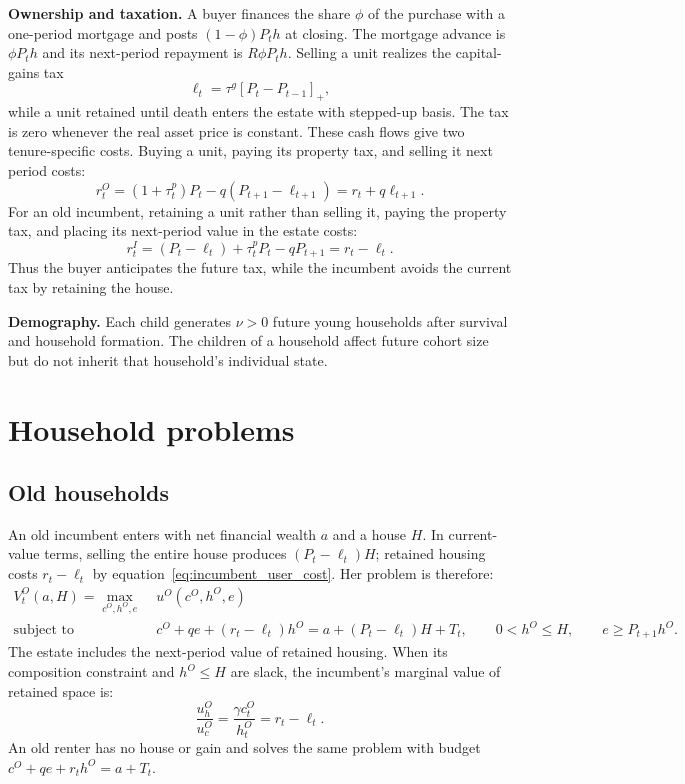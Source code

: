 \documentclass[10pt]{article}
\theoremstyle{definition}
\begin{document}
\textbf{Ownership and taxation.} A buyer finances the share $\phi$ of the
purchase with a one-period mortgage and posts $(1-\phi)P_th$ at closing. The
mortgage advance is $\phi P_th$ and its next-period repayment is
$R\phi P_th$. Selling a unit realizes the capital-gains tax
\begin{equation}
 \ell_t=\tau^g[P_t-P_{t-1}]_+,
 \label{eq:gains_tax}
\end{equation}
while a unit retained until death enters the estate with stepped-up basis. The
tax is zero whenever the real asset price is constant. These cash flows give
two tenure-specific costs. Buying a unit, paying its
property tax, and selling it next period costs:
\begin{equation}
 r_t^O=(1+\tau_t^p)P_t-q(P_{t+1}-\ell_{t+1})
 =r_t+q\ell_{t+1}.
 \label{eq:owner_user_cost}
\end{equation}
For an old incumbent, retaining a unit rather than selling it, paying the
property tax, and placing its next-period value in the estate costs:
\begin{equation}
 r_t^I=(P_t-\ell_t)+\tau_t^pP_t-qP_{t+1}=r_t-\ell_t.
 \label{eq:incumbent_user_cost}
\end{equation}
Thus the buyer anticipates the future tax, while the incumbent avoids the
current tax by retaining the house.

\textbf{Demography.} Each child generates $\nu>0$ future young households
after survival and household formation. The children of a household affect
future cohort size but do not inherit that household's individual state.

\section{Household problems}

\subsection{Old households}

An old incumbent enters with net financial wealth $a$ and a house $H$. In
current-value terms, selling the entire house produces $(P_t-\ell_t)H$;
retained housing costs $r_t-\ell_t$ by
equation~\eqref{eq:incumbent_user_cost}. Her problem is therefore:
\begin{align}
 V_t^O(a,H)=\max_{c^O,h^O,e}\;&u^O(c^O,h^O,e)
 \label{eq:old_owner_problem}\\
 \text{subject to}\quad
 &c^O+q e+(r_t-\ell_t)h^O
 =a+(P_t-\ell_t)H+T_t,\qquad 0<h^O\leq H,
 \qquad e\geq P_{t+1}h^O.\nonumber
\end{align}
The estate includes the next-period value of retained housing. When its
composition constraint and $h^O\leq H$ are slack, the incumbent's marginal
value of retained space is:
\begin{equation}
 \frac{u_h^O}{u_c^O}=\frac{\gamma c_t^O}{h_t^O}=r_t-\ell_t.
 \label{eq:old_marginal_value}
\end{equation}
An old renter has no house or gain and solves the same problem with budget
$c^O+qe+r_th^O=a+T_t$.
\end{document}
